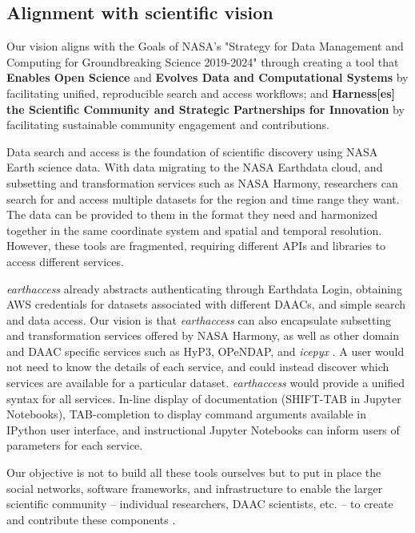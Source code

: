 \documentclass{ROSES-NASA-proposal}
\newcommand{\earthaccess}{\textit{earthaccess}\xspace} %
\begin{document}
\subsection{Alignment with scientific vision}

Our vision aligns with the Goals of NASA's "Strategy for Data Management and Computing for Groundbreaking Science 2019-2024" \citep{zurbuchen2019} through creating a tool that \textbf{Enables Open Science} and \textbf{Evolves Data and Computational Systems} by facilitating unified, reproducible search and access workflows; and \textbf{Harness[es] the Scientific Community and Strategic Partnerships for Innovation} by facilitating sustainable community engagement and contributions.

Data search and access is the foundation of scientific discovery using NASA Earth science data. With data migrating to the NASA Earthdata cloud, and subsetting and transformation services such as NASA Harmony, researchers can search for and access multiple datasets for the region and time range they want. The data can be provided to them in the format they need and harmonized together in the same coordinate system and spatial and temporal resolution. However, these tools are fragmented, requiring different APIs and libraries to access different services.

\earthaccess already abstracts authenticating through Earthdata Login, obtaining AWS credentials for datasets associated with different DAACs, and simple search and data access. Our vision is that \earthaccess can also encapsulate subsetting and transformation services offered by NASA Harmony, as well as other domain and DAAC specific services such as HyP3, OPeNDAP, and \textit{icepyx} \citep[][Strategy 2.4]{zurbuchen2019}. A user would not need to know the details of each service, and could instead discover which services are available for a particular dataset. \earthaccess would provide a unified syntax for all services. In-line display of documentation (SHIFT-TAB in Jupyter Notebooks), TAB-completion to display command arguments available in IPython user interface, and instructional Jupyter Notebooks can inform users of parameters for each service.

Our objective is not to build all these tools ourselves but to put in place the social networks, software frameworks, and infrastructure to enable the larger scientific community -- individual researchers, DAAC scientists, etc. -- to create and contribute these components \citep[][Strategies 3.1, 3.2, and 3.3]{zurbuchen2019}.
\end{document}
